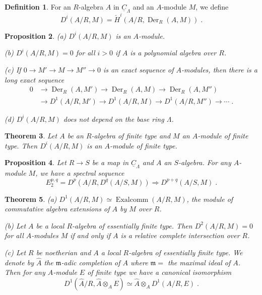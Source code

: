 \documentclass[11pt]{article}
\theoremstyle{plain}
\newtheorem{theorem}{Theorem}[section]
\newtheorem{proposition}[theorem]{Proposition}
\theoremstyle{definition}
\newtheorem{definition}[theorem]{Definition}
\theoremstyle{remark}
\DeclareMathOperator{\Exalcomm}{Exalcomm}
\DeclareMathOperator{\Der}{Der}
\newcommand{\fm}{\mathfrak m}
\begin{document}
\begin{definition}
For an $R$-algebra $A$ in $\underline{C}_{\Lambda}$ and an $A$-module $M$, we define
\[
D^i(A/R, M) = \check{H}^i(A/R, \Der_R(A, M))\;.
\]
\end{definition}

\begin{proposition}
\textup{(a)} $D^i(A/R, M)$ is an $A$-module.

\textup{(b)} $D^i(A/R, M) = 0$ for all $i > 0$ if $A$ is a polynomial algebra over $R$.

\textup{(c)} If $0 \to M' \to M \to M'' \to 0$ is an exact sequence of $A$-modules, then there is a long exact sequence
\begin{align*}
0 &\to \Der_R(A, M') \to \Der_R(A, M) \to \Der_R(A, M'') \\
&\to D^1(A/R, M') \to D^1(A/R, M) \to D^1(A/R, M'') \to \cdots\;.
\end{align*}

\textup{(d)} $D^i(A/R, M)$ does not depend on the base ring $\Lambda$.
\end{proposition}

\begin{theorem}
Let $A$ be an $R$-algebra of finite type and $M$ an $A$-module of finite type. Then $D^i(A/R, M)$ is an $A$-module of finite type.
\end{theorem}

\begin{proposition}
Let $R \to S$ be a map in $\underline{C}_{\Lambda}$ and $A$ an $S$-algebra. For any $A$-module $M$, we have a spectral sequence
\[
E_2^{p,q} = D^p(A/R, D^q(A/S, M)) \Longrightarrow D^{p+q}(A/S, M)\;.
\]
\end{proposition}

\begin{theorem}
\textup{(a)} $D^1(A/R, M) \simeq \Exalcomm(A/R, M)$, the module of commutative algebra extensions of $A$ by $M$ over $R$.

\textup{(b)} Let $A$ be a local $R$-algebra of essentially finite type. Then $D^2(A/R, M) = 0$ for all $A$-modules $M$ if and only if $A$ is a relative complete intersection over $R$.

\textup{(c)} Let $R$ be noetherian and $A$ a local $R$-algebra of essentially finite type. We denote by $\widehat{A}$ the $\fm$-adic completion of $A$ where $\fm = $ the maximal ideal of $A$. Then for any $A$-module $E$ of finite type we have a canonical isomorphism
\[
D^1(\widehat{A}/R, \widehat{A} \otimes_A E) \simeq \widehat{A} \otimes_A D^1(A/R, E)\;.
\]
\end{theorem}
\end{document}
